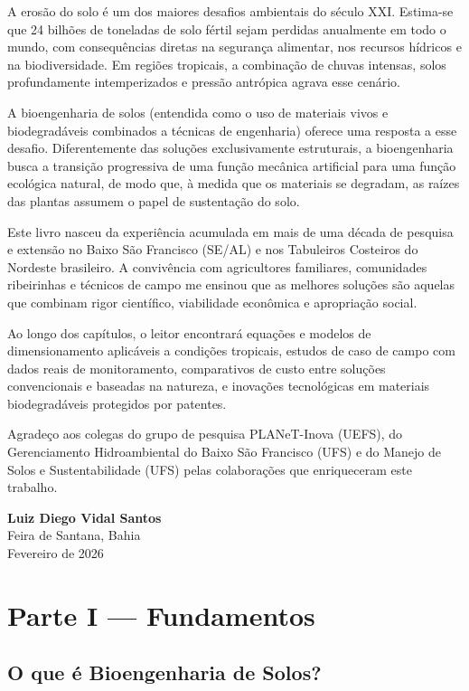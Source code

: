 \documentclass[
  portuguese,
  11pt,
  a4paper,
  open=any]{scrbook}
\begin{document}
A erosão do solo é um dos maiores desafios ambientais do século XXI.
Estima-se que 24 bilhões de toneladas de solo fértil sejam perdidas
anualmente em todo o mundo, com consequências diretas na segurança
alimentar, nos recursos hídricos e na biodiversidade. Em regiões
tropicais, a combinação de chuvas intensas, solos profundamente
intemperizados e pressão antrópica agrava esse cenário.

A bioengenharia de solos (entendida como o uso de materiais vivos e
biodegradáveis combinados a técnicas de engenharia) oferece uma resposta
a esse desafio. Diferentemente das soluções exclusivamente estruturais,
a bioengenharia busca a transição progressiva de uma função mecânica
artificial para uma função ecológica natural, de modo que, à medida que
os materiais se degradam, as raízes das plantas assumem o papel de
sustentação do solo.

Este livro nasceu da experiência acumulada em mais de uma década de
pesquisa e extensão no Baixo São Francisco (SE/AL) e nos Tabuleiros
Costeiros do Nordeste brasileiro. A convivência com agricultores
familiares, comunidades ribeirinhas e técnicos de campo me ensinou que
as melhores soluções são aquelas que combinam rigor científico,
viabilidade econômica e apropriação social.

Ao longo dos capítulos, o leitor encontrará equações e modelos de
dimensionamento aplicáveis a condições tropicais, estudos de caso de
campo com dados reais de monitoramento, comparativos de custo entre
soluções convencionais e baseadas na natureza, e inovações tecnológicas
em materiais biodegradáveis protegidos por patentes.

Agradeço aos colegas do grupo de pesquisa PLANeT-Inova (UEFS), do
Gerenciamento Hidroambiental do Baixo São Francisco (UFS) e do Manejo de
Solos e Sustentabilidade (UFS) pelas colaborações que enriqueceram este
trabalho.

\textbf{Luiz Diego Vidal Santos}\\
Feira de Santana, Bahia\\
Fevereiro de 2026

\part{Parte I --- Fundamentos}

\chapter{O que é Bioengenharia de
Solos?}\label{o-que-uxe9-bioengenharia-de-solos}
\end{document}
